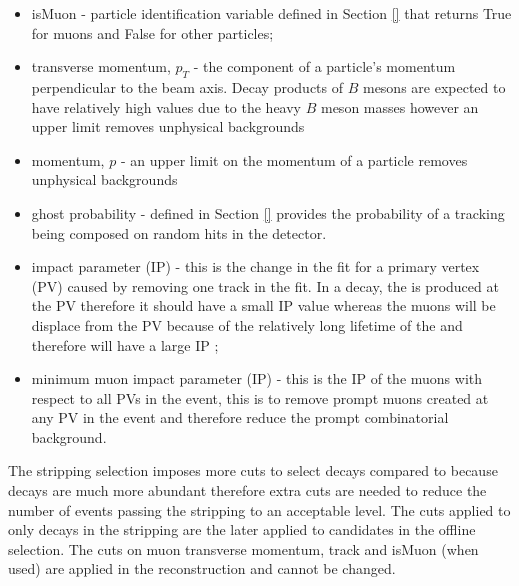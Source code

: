 \begin{itemize}
\item isMuon - particle identification variable defined in Section \ref{} that returns True for muons and False for other particles;
\item transverse momentum, $p_{T}$ - the component of a particle's momentum perpendicular to the beam axis. Decay products of $B$ mesons are expected to have relatively high \pt values due to the heavy $B$ meson masses however an upper limit removes unphysical backgrounds
\item momentum, $p$ - an upper limit on the momentum of a particle  removes unphysical backgrounds
\item ghost probability - defined in Section \ref{} provides the probability of a tracking being composed on random hits in the detector.
\item impact parameter (IP) \chisqd $ $- this is the change in the fit for a primary vertex (PV) caused by removing one track in the fit. In a \bsmumu decay, the \bs is produced at the PV therefore it should have a small IP \chisqd value whereas the muons will be displace from the PV because of the relatively long lifetime of the \bs and therefore will have a large IP \chisqd;
\item minimum muon impact parameter (IP) \chisqd $ $- this is the IP \chisqd of the muons with respect to all PVs in the event, this is to remove prompt muons created at any PV in the event and therefore reduce the prompt combinatorial background. 
\end{itemize}

The stripping selection imposes more cuts to select \bhh decays compared to \bsmumu because \bhh decays are much more abundant therefore extra cuts are needed to reduce the number of events passing the stripping to an acceptable level. The cuts applied to only \bhh decays in the stripping are the later applied to \bsmumu candidates in the offline selection. The cuts on muon transverse momentum, track \chisqd and isMuon (when used) are applied in the reconstruction and cannot be changed.

